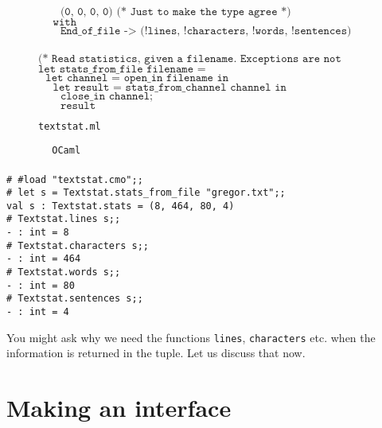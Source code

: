 \documentclass[]{book}
\newcommand{\smspace}{\vspace{4mm}}
\begin{document}
\begin{figure}
\begin{center}
{\begin{minipage}{0.9\textwidth}
$\texttt{~~~~~~(0, 0, 0, 0) (* Just to make the type agree *)}$\\
$\texttt{~~~~with}$\\
$\texttt{~~~~~~End\_of\_file -> (!lines, !characters, !words, !sentences)}$\\
\\
$\texttt{(* Read statistics, given a filename.\ Exceptions are not handled *)}$\\
$\texttt{let stats\_from\_file filename =}$\\
$\texttt{~~let channel = open\_in filename in}$\\
$\texttt{~~~~let result = stats\_from\_channel channel in}$\\
$\texttt{~~~~~~close\_in channel;}$\\
$\texttt{~~~~~~result}$\vphantom{g}
\end{minipage}}
\end{center}
\caption{\small\texttt{textstat.ml}}
\label{textstat2.ml}
\end{figure}


\smspace
\noindent\verb!        OCaml!\\
\noindent\\
\noindent\texttt{\# \#load "textstat.cmo";;}\\
\noindent\texttt{\# let s = Textstat.stats\_from\_file "gregor.txt";;}\\
\noindent\texttt{val s :\ Textstat.stats = (8, 464, 80, 4)}\\
\noindent\texttt{\# Textstat.lines s;;}\\
\noindent\texttt{- :\ int = 8}\\
\noindent\texttt{\# Textstat.characters s;;}\\
\noindent\texttt{- :\ int = 464}\\
\noindent\texttt{\# Textstat.words s;;}\\
\noindent\texttt{- :\ int = 80}\\
\noindent\texttt{\# Textstat.sentences s;;}\\
\noindent\texttt{- :\ int = 4}\vphantom{g}
\smspace

\noindent You might ask why we need the functions \texttt{lines}, \texttt{characters} etc. when the information is returned in the tuple. Let us discuss that now.

\section*{Making an interface}
\end{document}
